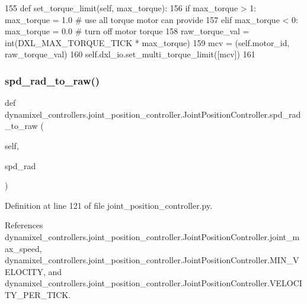 \begin{DoxyCode}
155     \textcolor{keyword}{def }set\_torque\_limit(self, max\_torque):
156         \textcolor{keywordflow}{if} max\_torque > 1: max\_torque = 1.0         \textcolor{comment}{# use all torque motor can provide}
157         \textcolor{keywordflow}{elif} max\_torque < 0: max\_torque = 0.0       \textcolor{comment}{# turn off motor torque}
158         raw\_torque\_val = int(DXL\_MAX\_TORQUE\_TICK * max\_torque)
159         mcv = (self.motor\_id, raw\_torque\_val)
160         self.dxl\_io.set\_multi\_torque\_limit([mcv])
161 
\end{DoxyCode}
\mbox{\label{classdynamixel__controllers_1_1joint__position__controller_1_1_joint_position_controller_ac82aa3145e2ba55f75b43563827828d5}} 
\subsubsection{\texorpdfstring{spd\+\_\+rad\+\_\+to\+\_\+raw()}{spd\_rad\_to\_raw()}}
{\footnotesize\ttfamily def dynamixel\+\_\+controllers.\+joint\+\_\+position\+\_\+controller.\+Joint\+Position\+Controller.\+spd\+\_\+rad\+\_\+to\+\_\+raw (\begin{DoxyParamCaption}\item[{}]{self,  }\item[{}]{spd\+\_\+rad }\end{DoxyParamCaption})}



Definition at line 121 of file joint\+\_\+position\+\_\+controller.\+py.



References dynamixel\+\_\+controllers.\+joint\+\_\+position\+\_\+controller.\+Joint\+Position\+Controller.\+joint\+\_\+max\+\_\+speed, dynamixel\+\_\+controllers.\+joint\+\_\+position\+\_\+controller.\+Joint\+Position\+Controller.\+M\+I\+N\+\_\+\+V\+E\+L\+O\+C\+I\+TY, and dynamixel\+\_\+controllers.\+joint\+\_\+position\+\_\+controller.\+Joint\+Position\+Controller.\+V\+E\+L\+O\+C\+I\+T\+Y\+\_\+\+P\+E\+R\+\_\+\+T\+I\+CK.



